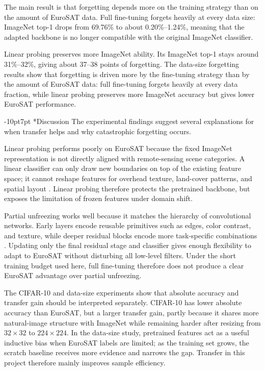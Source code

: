 \documentclass[10pt,twocolumn,letterpaper]{article}
\makeatletter
\def\cvprsection{\@startsection {section}{1}{\z@}
   {-10pt}{7pt} {\large\bfseries}}
\def\cvprssect#1{\cvprsection*{#1}}
\def\cvprsect#1{\cvprsection{\texorpdfstring{\hskip -1em.~}{}#1}}
\def\section{\@ifstar\cvprssect\cvprsect}
\makeatother
\begin{document}
The main result is that forgetting depends more on the training strategy than on the amount of EuroSAT data. Full fine-tuning forgets heavily at every data size: ImageNet top-1 drops from 69.76\% to about 0.20\%--1.24\%, meaning that the adapted backbone is no longer compatible with the original ImageNet classifier.

Linear probing preserves more ImageNet ability. Its ImageNet top-1 stays around 31\%--32\%, giving about 37--38 points of forgetting. The data-size forgetting results show that forgetting is driven more by the fine-tuning strategy than by the amount of EuroSAT data: full fine-tuning forgets heavily at every data fraction, while linear probing preserves more ImageNet accuracy but gives lower EuroSAT performance.


\section{Discussion}
The experimental findings suggest several explanations for when transfer helps and why catastrophic forgetting occurs.

Linear probing performs poorly on EuroSAT because the fixed ImageNet representation is not directly aligned with remote-sensing scene categories. A linear classifier can only draw new boundaries on top of the existing feature space; it cannot reshape features for overhead texture, land-cover patterns, and spatial layout \cite{cheng2020,helber2019}. Linear probing therefore protects the pretrained backbone, but exposes the limitation of frozen features under domain shift.

Partial unfreezing works well because it matches the hierarchy of convolutional networks. Early layers encode reusable primitives such as edges, color contrast, and texture, while deeper residual blocks encode more task-specific combinations \cite{yosinski2014}. Updating only the final residual stage and classifier gives enough flexibility to adapt to EuroSAT without disturbing all low-level filters. Under the short training budget used here, full fine-tuning therefore does not produce a clear EuroSAT advantage over partial unfreezing.

The CIFAR-10 and data-size experiments show that absolute accuracy and transfer gain should be interpreted separately. CIFAR-10 has lower absolute accuracy than EuroSAT, but a larger transfer gain, partly because it shares more natural-image structure with ImageNet while remaining harder after resizing from $32 \times 32$ to $224 \times 224$. In the data-size study, pretrained features act as a useful inductive bias when EuroSAT labels are limited; as the training set grows, the scratch baseline receives more evidence and narrows the gap. Transfer in this project therefore mainly improves sample efficiency.
\end{document}
